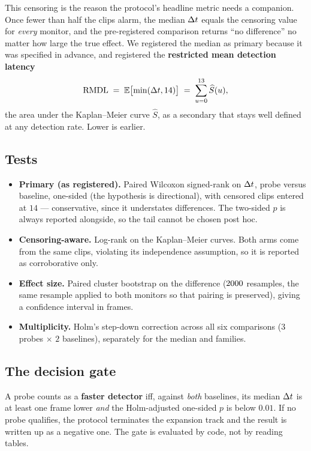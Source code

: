 This censoring is the reason the protocol's headline metric needs a companion.
Once fewer than half the clips alarm, the median $\Delta t$ equals the censoring
value for \emph{every} monitor, and the pre-registered comparison returns ``no
difference'' no matter how large the true effect. We registered the median as
primary because it was specified in advance, and registered the
\textbf{restricted mean detection latency}
\begin{equation}
\mathrm{RMDL} \;=\; \mathbb{E}\bigl[\min(\Delta t, 14)\bigr] \;=\; \sum_{u=0}^{13} \widehat S(u),
\end{equation}
the area under the Kaplan--Meier curve $\widehat S$, as a secondary that stays
well defined at any detection rate. Lower is earlier.

\subsection{Tests}

\begin{itemize}
\item \textbf{Primary (as registered).} Paired Wilcoxon signed-rank on $\Delta t$,
probe versus baseline, one-sided (the hypothesis is directional), with censored
clips entered at $14$ --- conservative, since it understates differences. The
two-sided $p$ is always reported alongside, so the tail cannot be chosen post
hoc.
\item \textbf{Censoring-aware.} Log-rank on the Kaplan--Meier curves. Both arms
come from the same clips, violating its independence assumption, so it is
reported as corroborative only.
\item \textbf{Effect size.} Paired cluster bootstrap on the \RMTA{} difference
($2000$ resamples, the same resample applied to both monitors so that
pairing is preserved), giving a confidence interval in frames.
\item \textbf{Multiplicity.} Holm's step-down correction across all six
comparisons ($3$ probes $\times$ $2$ baselines), separately for the median and
\RMTA{} families.
\end{itemize}

\subsection{The decision gate}

A probe counts as a \textbf{faster detector} iff, against \emph{both} baselines, its
median $\Delta t$ is at least one frame lower \emph{and} the Holm-adjusted one-sided
$p$ is below $0.01$. If no probe qualifies, the protocol terminates the
expansion track and the result is written up as a negative one. The gate is
evaluated by code, not by reading tables.

